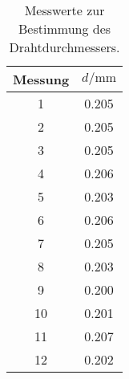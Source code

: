 \begin{table}
  \centering
  \caption{Messwerte zur Bestimmung des Drahtdurchmessers.}
  \label{tab:Drahtdurchmesser}
  \begin{tabular}{S[table-format=2] S[table-format=1.3]}
    \toprule
    {Messung} & {$d/\si{\milli\meter}$} \\
    	& 0.205 \\
    2	& 0.205 \\
    3	& 0.205 \\
    4	& 0.206 \\
    5	& 0.203 \\
    6	& 0.206 \\
    7	& 0.205 \\
    8	& 0.203 \\
    9	& 0.200 \\
    10	& 0.201 \\
    11	& 0.207 \\
    12	& 0.202 \\
    \bottomrule
  \end{tabular}
\end{table}
